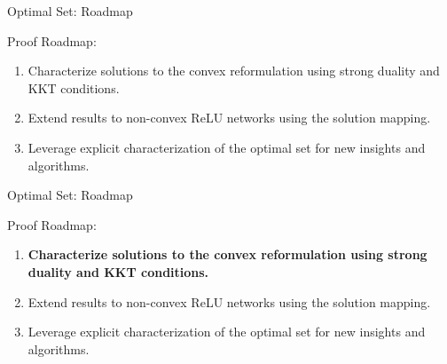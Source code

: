 \documentclass[usenames,dvipsnames,mathserif,notheorems]{beamer}
\newcommand{\bad}[1]{\textcolor{bad}{#1}}
\newcommand{\good}[1]{\textcolor{good}{#1}}
\begin{document}
\begin{frame}{Optimal Set: Roadmap}

	{
		\large
		{\Large
			Proof Roadmap:
		}
		\vspace{2em}
		\begin{enumerate}
			\large
			\item \pause
			      Characterize solutions to the \good{convex reformulation}
			      using strong duality and KKT conditions.
			      \vspace{1ex}
			      \pause
			\item Extend results to \bad{non-convex} ReLU networks
			      using the solution mapping.
			      \vspace{1ex}
			      \pause
			\item Leverage explicit characterization of the optimal
			      set for \good{new insights and algorithms}.
		\end{enumerate}
	}


\end{frame}

\begin{frame}{Optimal Set: Roadmap}

	{
		\large
		{\Large
			Proof Roadmap:
		}
		\vspace{2em}
		\begin{enumerate}
			\large
			\item \textbf{Characterize solutions to the \good{convex reformulation}
				      using strong duality and KKT conditions.}
			      \vspace{1ex}
			\item Extend results to \bad{non-convex} ReLU networks
			      using the solution mapping.
			      \vspace{1ex}
			\item Leverage explicit characterization of the optimal
			      set for \good{new insights and algorithms}.
		\end{enumerate}
	}

\end{frame}
\end{document}
